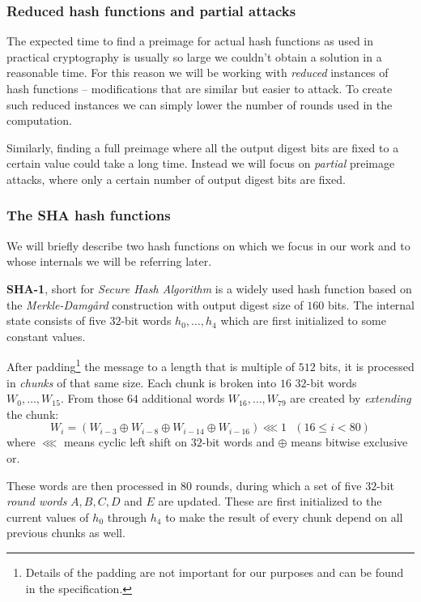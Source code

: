 \subsubsection{Reduced hash functions and partial attacks}
The expected time to find a preimage for actual hash functions as used in practical cryptography is usually so large we couldn't obtain a solution in a reasonable time.
For this reason we will be working with \emph{reduced} instances of hash functions -- modifications that are similar but easier to attack.
To create such reduced instances we can simply lower the number of rounds used in the computation.

Similarly, finding a full preimage where all the output digest bits are fixed to a certain value could take a long time.
Instead we will focus on \emph{partial} preimage attacks, where only a certain number of output digest bits are fixed.

\subsubsection{The SHA hash functions}
We will briefly describe two hash functions on which we focus in our work and to whose internals we will be referring later.

\textbf{SHA-1}, short for \emph{Secure Hash Algorithm} \cite{NIST1995FIPS180-1} is a widely used hash function based on the \emph{Merkle-Damg\aa rd} construction \cite{merkle1979secrecy} with output digest size of $160$ bits.
The internal state consists of five $32$-bit words $h_0, \ldots, h_4$ which are first initialized to some constant values.

After padding\footnote{Details of the padding are not important for our purposes and can be found in the specification.} the message to a length that is multiple of $512$ bits, it is processed in \emph{chunks} of that same size.
Each chunk is broken into $16$ $32$-bit words $W_0, \dots, W_{15}$.
From those $64$ additional words $W_{16}, \dots, W_{79}$ are created by \emph{extending} the chunk:
\begin{equation}
W_i = (W_{i-3} \oplus W_{i-8} \oplus W_{i-14} \oplus W_{i-16}) \lll 1 ~~~ (16 \le i < 80) \label{eqn:sha1-extend}
\end{equation}
where $\lll$ means cyclic left shift on $32$-bit words and $\oplus$ means bitwise exclusive or.

These words are then processed in $80$ rounds, during which a set of five $32$-bit \emph{round words} $A, B, C, D$ and $E$ are updated.
These are first initialized to the current values of $h_0$ through $h_4$ to make the result of every chunk depend on all previous chunks as well.

